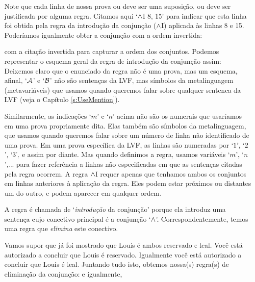 \begin{fitchproof}
	 
\end{fitchproof}

 Note que cada linha de nossa prova  ou deve ser uma suposição, ou deve ser justificada por alguma regra.    Citamos  aqui   `$\wedge$I 8, 15' para indicar que esta linha foi obtida pela regra da introdução da conjunção  ($\wedge$I) aplicada às linhas 8 e 15.  Poderíamos igualmente obter a conjunção com a ordem invertida:
\begin{fitchproof}
	 
\end{fitchproof}
 com a citação invertida para capturar a ordem  dos  conjuntos. 
Podemos representar o esquema geral da regra de introdução da conjunção assim:
Deixemos claro que o enunciado da regra não é uma prova, mas um esquema, afinal, `$\mathcal{A}$'  e `$\mathcal{B}$' não são sentenças da LVF, mas símbolos da metalinguagem (metavariáveis) que usamos quando queremos falar sobre qualquer sentenca da LVF (veja o Capítulo \ref{s:UseMention}). 

Similarmente, as indicações `$m$' e `$n$' acima não são os numerais que usaríamos em uma prova propriamente dita. Elas também são símbolos da metalinguagem, que usamos quando queremos falar sobre um número de linha não identificado de uma prova. Em uma  prova específica da LVF, as linhas  são numeradas por `$1$', `$2$', `$3$', e assim por diante.  Mas quando definimos a regra, usamos variáveis `$m$', `$n$',...  para fazer referência a linhas não especificadas em que as sentenças citadas pela regra ocorrem.
A regra $\wedge$I requer apenas que tenhamos ambos os conjuntos em linhas anteriores à aplicação da regra. Eles podem estar próximos ou distantes um do outro, e podem aparecer em qualquer ordem.

A regra é chamada de `\emph{introdução} da conjunção'  porque  ela introduz   uma sentença cujo conectivo principal é a conjunção `$\wedge$'.  Correspondentemente,  temos uma regra que \emph{elimina}  este conectivo. 

 Vamos supor que já foi mostrado que Louis é ambos  reservado e  leal.  Você   está autorizado a concluir que Louis   é reservado. Igualmente você   está autorizado a concluir que Louis é leal. Juntando tudo isto, obtemos nossa(s) regra(s) de eliminação da conjunção:
e igualmente, 

